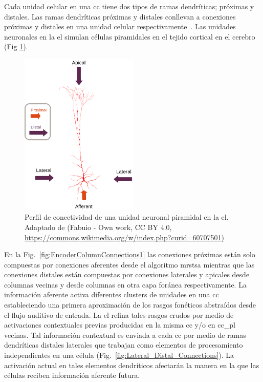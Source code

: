 {Cada unidad celular en una \gls{cc} tiene dos tipos de ramas dendríticas; próximas y distales. Las ramas dendríticas próximas y distales conllevan a conexiones próximas y distales en una unidad celular respectivamente~\cite{10.1371/journal.pone.0217966}.
Las unidades neuronales en la \gls{el} simulan células piramidales en el tejido cortical en el cerebro (Fig \ref{fig:Pyramidal_Cell}).

\begin{figure}[h!]
    \centering
    \includegraphics[width=0.5\textwidth]{Pyramidal_Cell.png}
    \caption{Perfil de conectividad de una unidad neuronal piramidal en la \gls{el}. Adaptado de (Fabuio - Own work, CC BY 4.0, \protect\url{https://commons.wikimedia.org/w/index.php?curid=60707501)}}
    \label{fig:Pyramidal_Cell}
\end{figure}

En la Fig.~\ref{fig:EncoderColumnConnections1} las conexiones próximas están solo compuestas por conexiones aferentes desde el algoritmo \gls{mrstsa} mientras que las conexiones distales están compuestas por conexiones laterales y apicales desde columnas vecinas y desde columnas en otra capa foránea respectivamente.
La información aferente activa diferentes clusters de unidades en una \gls{cc} estableciendo una primera aproximación de los rasgos fonéticos abstraídos desde el flujo auditivo de entrada. 
La \gls{el} refina tales rasgos crudos por medio de activaciones contextuales previas producidas en la misma \gls{cc} y/o en \gls{cc_pl} vecinas.
Tal información contextual es enviada a cada \gls{cc} por medio de ramas dendríticas distales laterales que trabajan como elementos de procesamiento independientes en una célula (Fig.~\ref{fig:Lateral_Distal_Connections}).
La activación actual en tales elementos dendríticos afectarán la manera en la que las células reciben información aferente futura.

}
